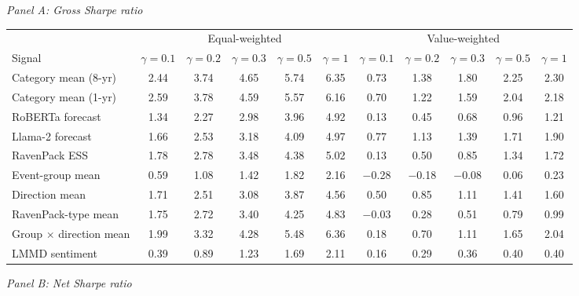 \begin{table}[htbp]
{\footnotesize
\textit{Panel A: Gross Sharpe ratio}\\[2pt]
\begin{adjustbox}{max width=\linewidth, max totalheight=0.28\textheight}
\begin{tabular}{lcccccccccc}
\toprule
 & \multicolumn{5}{c}{Equal-weighted} & \multicolumn{5}{c}{Value-weighted} \\
\cmidrule(lr){2-6} \cmidrule(lr){7-11}
Signal & $\gamma=0.1$ & $\gamma=0.2$ & $\gamma=0.3$ & $\gamma=0.5$ & $\gamma=1$ & $\gamma=0.1$ & $\gamma=0.2$ & $\gamma=0.3$ & $\gamma=0.5$ & $\gamma=1$ \\
\midrule
Category mean (8-yr) & 2.44 & 3.74 & 4.65 & 5.74 & 6.35 & \phantom{$-$}0.73 & \phantom{$-$}1.38 & \phantom{$-$}1.80 & 2.25 & 2.30 \\
Category mean (1-yr) & 2.59 & 3.78 & 4.59 & 5.57 & 6.16 & \phantom{$-$}0.70 & \phantom{$-$}1.22 & \phantom{$-$}1.59 & 2.04 & 2.18 \\
RoBERTa forecast & 1.34 & 2.27 & 2.98 & 3.96 & 4.92 & \phantom{$-$}0.13 & \phantom{$-$}0.45 & \phantom{$-$}0.68 & 0.96 & 1.21 \\
Llama-2 forecast & 1.66 & 2.53 & 3.18 & 4.09 & 4.97 & \phantom{$-$}0.77 & \phantom{$-$}1.13 & \phantom{$-$}1.39 & 1.71 & 1.90 \\
RavenPack ESS & 1.78 & 2.78 & 3.48 & 4.38 & 5.02 & \phantom{$-$}0.13 & \phantom{$-$}0.50 & \phantom{$-$}0.85 & 1.34 & 1.72 \\
Event-group mean & 0.59 & 1.08 & 1.42 & 1.82 & 2.16 & $-$0.28 & $-$0.18 & $-$0.08 & 0.06 & 0.23 \\
Direction mean & 1.71 & 2.51 & 3.08 & 3.87 & 4.56 & \phantom{$-$}0.50 & \phantom{$-$}0.85 & \phantom{$-$}1.11 & 1.41 & 1.60 \\
RavenPack-type mean & 1.75 & 2.72 & 3.40 & 4.25 & 4.83 & $-$0.03 & \phantom{$-$}0.28 & \phantom{$-$}0.51 & 0.79 & 0.99 \\
Group $\times$ direction mean & 1.99 & 3.32 & 4.28 & 5.48 & 6.36 & \phantom{$-$}0.18 & \phantom{$-$}0.70 & \phantom{$-$}1.11 & 1.65 & 2.04 \\
LMMD sentiment & 0.39 & 0.89 & 1.23 & 1.69 & 2.11 & \phantom{$-$}0.16 & \phantom{$-$}0.29 & \phantom{$-$}0.36 & 0.40 & 0.40 \\
\bottomrule
\end{tabular}
\end{adjustbox}
\par\medskip
\textit{Panel B: Net Sharpe ratio}\\[2pt]
\begin{adjustbox}{max width=\linewidth, max totalheight=0.28\textheight}

\end{adjustbox}}
\end{table}
